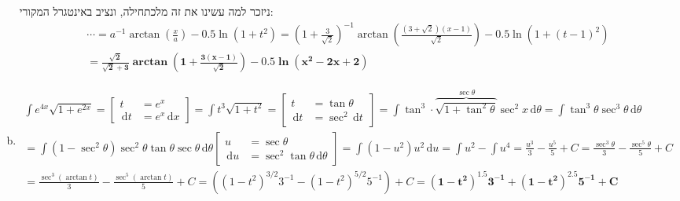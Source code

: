\documentclass[]{article}
\newcommand\tant  {\tan \theta}
\newcommand\sect  {\sec^2}
\newcommand\dx    {\,\mathrm{d}x}
\newcommand\dt    {\,\mathrm{d}t}
\newcommand\dtt   {\,\mathrm{d}\theta}
\newcommand\du    {\,\mathrm{d}u}
\newcommand\pus[2]{\csb{\begin{aligned}
			u &= #1 \\
			\du &= #2
\end{aligned}}}
\newcommand\pts[2]{\csb{\begin{aligned}
t &= #1 \quad \\
\dt &= #2
\end{aligned}}}
\newcommand\ta    {\theta}
\newcommand\op    {^{-1}}
\newcommand\cl [1]    {\left ( #1 \right )}
\newcommand\csb[1]    {\left [ #1 \right ]}
\begin{document}
\begin{enumerate}[a.]
			ניזכר למה עשינו את זה מלכתחילה, ונציב באינטגרל המקורי: 
			\begin{multline*}
				\cdots = a\op \arctan\cl{\frac{x}{a}} - 0.5\ln(1 + t^2) = \cl{1 + \frac{3}{\sqrt2}}\op \arctan \cl{\frac{(3 + \sqrt2)(x - 1)}{\sqrt2}} - 0.5 \ln (1 + (t - 1)^2) \\
				= \bm{\frac{\sqrt 2}{\sqrt 2 + 3} \arctan \cl{1 + \frac{3(x - 1)}{\sqrt2}} - 0.5\ln(x^2 - 2x + 2)}
			\end{multline*}
		\item 
			\begin{multline*}
				\int e^{4x}\sqrt{1 + e^{2x}} = \pts{e^{x}}{e^{x}\dx} = \int t^3\sqrt{1 + t^2} = \pts{\tant}{\sec^2\dt} = \int \tan^3 \cdot \overbrace{\sqrt{1 + \tan^2 \ta}}^{\sec\ta} \sec^2x \dtt = \int \tan^3\ta\sec^3\ta \dtt \\
				= \int (1 - \sec^2\ta) \sec^2\ta \tan\ta\sec\ta \dtt \pus{\sec \ta}{\sect\tant\dtt} = \int (1 - u^2)u^2 \du = \int u^2 - \int u^4 = \frac{u^3}{3} - \frac{u^5}{5} + C = \frac{\sec^3 \ta}{3} - \frac{\sec^5\ta}{5} +C \\
				= \frac{\sec^3(\arctan t)}{3} - \frac{\sec^5(\arctan t)}{5} + C = ((1 - t^2)^{3 / 2}3\op - (1 - t^2)^{5 / 2}5\op) + C = \bm{(1 - t^2)^{1.5}3\op + (1 - t^2)^{2.5}5\op + C}
			\end{multline*}
		\end{enumerate}
\end{document}
